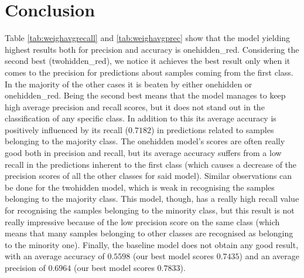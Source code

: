 \chapter{Conclusion}
Table \ref{tab:weighavgrecall} and \ref{tab:weighavgprec} show that the model yielding highest results both for precision and accuracy is onehidden\_red. Considering the second best (twohidden\_red), we notice it achieves the best result only when it comes to the precision for predictions about samples coming from the first class. In the majority of the other cases it is beaten by either onehidden or onehidden\_red. Being the second best means that the model manages to keep high average precision and recall scores, but it does not stand out in the classification of any specific class. In addition to this its average accuracy is positively influenced by its recall ($0.7182$) in predictions related to samples belonging to the majority class. The onehidden model's scores are often really good both in precision and recall, but its average accuracy suffers from a low recall in the predictions inherent to the first class (which causes a decrease of the precision scores of all the other classes for said model). Similar observations can be done for the twohidden model, which is weak in recognising the samples belonging to the majority class. This model, though, has a really high recall value for recognising the samples belonging to the minority class, but this result is not really impressive because of the low precision score on the same class (which means that many samples belonging to other classes are recognised as belonging to the minority one). Finally, the baseline model does not obtain any good result, with an average accuracy of $0.5598$ (our best model scores $0.7435$) and an average precision of $0.6964$ (our best model scores $0.7833$).


